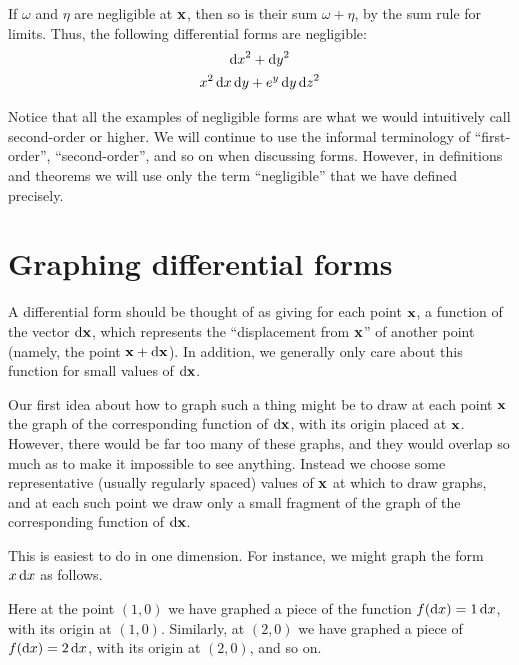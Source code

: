 \documentclass[12pt]{amsart}
\begin{document}
\begin{eg}
  If $\omega$ and $\eta$ are negligible at $\mathbf{x}$, then so is their sum $\omega+\eta$, by the sum rule for limits.
  Thus, the following differential forms are negligible:
  \begin{gather*}
    {\ensuremath{\mathrm{d} x}}^2 + {\mathrm{d} y}^2\\
    x^2 \,{\mathrm{d} x}\,{\mathrm{d} y} + e^{y}\,{\mathrm{d} y}\,{\mathrm{d} z}^2
  \end{gather*}
\end{eg}

Notice that all the examples of negligible forms are what we would intuitively call second-order or higher.
We will continue to use the informal terminology of ``first-order'', ``second-order'', and so on when discussing forms.
However, in definitions and theorems we will use only the term ``negligible'' that we have defined precisely.


\section{Graphing differential forms}
\label{sec:graphing-differential-forms}

A differential form should be thought of as giving for each point $\mathbf{x}$, a function of the vector ${\mathrm{d} \mathbf{x}}$, which represents the ``displacement from $\mathbf{x}$'' of another point (namely, the point $\mathbf{x}+{\mathrm{d} \mathbf{x}}$).
In addition, we generally only care about this function for small values of ${\mathrm{d} \mathbf{x}}$.

Our first idea about how to graph such a thing might be to draw at each point $\mathbf{x}$ the graph of the corresponding function of ${\mathrm{d} \mathbf{x}}$, with its origin placed at $\mathbf{x}$.
However, there would be far too many of these graphs, and they would overlap so much as to make it impossible to see anything.
Instead we choose some representative (usually regularly spaced) values of $\mathbf{x}$ at which to draw graphs, and at each such point we draw only a small fragment of the graph of the corresponding function of ${\mathrm{d} \mathbf{x}}$.

This is easiest to do in one dimension.
For instance, we might graph the form $x\,{\mathrm{d} x}$ as follows.
\begin{center}
\end{center}
Here at the point $(1,0)$ we have graphed a piece of the function $f({\mathrm{d} x}) = 1\,{\mathrm{d} x}$, with its origin at $(1,0)$.
Similarly, at $(2,0)$ we have graphed a piece of $f({\mathrm{d} x}) = 2\,{\mathrm{d} x}$, with its origin at $(2,0)$, and so on.
\end{document}
